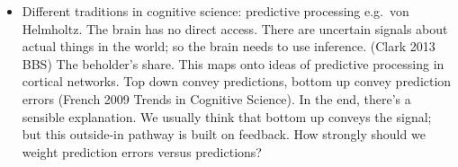 \begin{enumerate}[start=4]
\begin{enumerate}
\begin{itemize}
  (Brandom, Walton).
\item Different traditions in cognitive science: predictive processing
  e.g.~von Helmholtz.  The brain has no direct access.  There are
  uncertain signals about actual things in the world; so the brain
  needs to use inference.  (Clark 2013 BBS) The beholder's share.
  This maps onto ideas of predictive processing in cortical networks.
  Top down convey predictions, bottom up convey prediction errors
  (French 2009 Trends in Cognitive Science).  In the end, there's a
  sensible explanation.  We usually think that bottom up conveys the
  signal; but this outside-in pathway is built on feedback.  How
  strongly should we weight prediction errors versus predictions?
\end{itemize}
\end{enumerate}
\end{enumerate}
